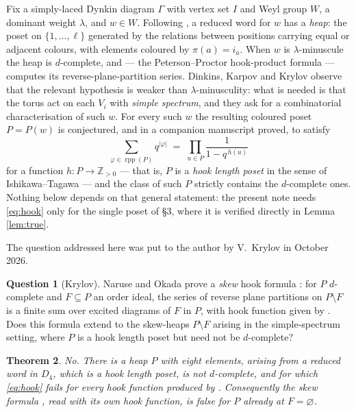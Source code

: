 \documentclass[reqno]{amsart}
\theoremstyle{plain}
\newtheorem{theorem}{Theorem}[section]
\theoremstyle{definition}
\newtheorem{question}[theorem]{Question}
\DeclareMathOperator{\rpp}{rpp}
\begin{document}
Fix a simply-laced Dynkin diagram $\Gamma$ with vertex set $I$ and Weyl group
$W$, a dominant weight $\lambda$, and $w\in W$.  Following
\cite[\S5.1]{DKK}, a reduced word for $w$ has a \emph{heap}: the poset on
$\{1,\dots,\ell\}$ generated by the relations between positions carrying equal
or adjacent colours, with elements coloured by $\pi(a)=i_a$.  When $w$ is
$\lambda$-minuscule the heap is $d$-complete, and
\cite[Thm.~1.1]{NO} --- the Peterson--Proctor hook-product formula --- computes
its reverse-plane-partition series.  Dinkins, Karpov and Krylov observe
\cite[\S5.4.2]{DKK} that the relevant hypothesis is weaker than
$\lambda$-minusculity: what is needed is that the torus act on each $V_i$ with
\emph{simple spectrum}, and they ask for a combinatorial characterisation of
such $w$.  For every such $w$ the resulting coloured poset $P=P(w)$ is conjectured, and
in a companion manuscript proved, to satisfy
\begin{equation}\label{eq:hook}
   \sum_{\varphi\in\rpp(P)}q^{|\varphi|}
   \;=\;\prod_{u\in P}\frac{1}{1-q^{\,h(u)}}
\end{equation}
for a function $h:P\to\mathbb{Z}_{>0}$ --- that is, $P$ is a \emph{hook length
poset} in the sense of Ishikawa--Tagawa \cite{IT} --- and the class of such $P$
strictly contains the $d$-complete ones.  Nothing below depends on that
general statement: the present note needs \eqref{eq:hook} only for the single
poset of \S3, where it is verified directly in Lemma \ref{lem:true}.

The question addressed here was put to the author by V.~Krylov in October
2026.

\begin{question}[Krylov]\label{q:main}
Naruse and Okada prove a \emph{skew} hook formula \cite[Thm.~1.2]{NO}: for $P$
$d$-complete and $F\subseteq P$ an order ideal, the series of reverse plane
partitions on $P\setminus F$ is a finite sum over excited diagrams of $F$ in
$P$, with hook function given by \cite[Def.~2.6]{NO}.  Does this formula extend
to the skew-heaps $P\setminus F$ arising in the simple-spectrum setting, where
$P$ is a hook length poset but need not be $d$-complete?
\end{question}

\begin{theorem}\label{thm:main}
No.  There is a heap $P$ with eight elements, arising from a reduced word in
$D_4$, which is a hook length poset, is not $d$-complete, and for which
\eqref{eq:hook} fails for \emph{every} hook function produced by
\cite[Def.~2.6]{NO}.  Consequently the skew formula \cite[Thm.~1.2]{NO}, read
with its own hook function, is false for $P$ already at $F=\varnothing$.
\end{theorem}
\end{document}
